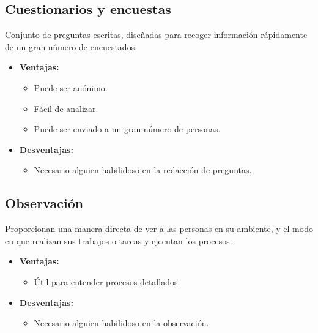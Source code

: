 \documentclass{templateApunte}
\begin{document}
\subsection{Cuestionarios y encuestas}\hypertarget{cuestionarios_y_encuestas}{}
Conjunto de preguntas escritas, diseñadas para recoger información rápidamente de un gran número de encuestados.
\begin{itemize}
  \item \textbf{Ventajas:}
  \begin{itemize}
    \item Puede ser anónimo.
    \item Fácil de analizar.
    \item Puede ser enviado a un gran número de personas.
  \end{itemize}
  \item \textbf{Desventajas:}
  \begin{itemize}
    \item Necesario alguien habilidoso en la redacción de preguntas.
  \end{itemize}
\end{itemize}

\subsection{Observación}\hypertarget{observacion}{}
Proporcionan una manera directa de ver a las personas en su ambiente, y el modo en que realizan sus trabajos o tareas y ejecutan los procesos.
\begin{itemize}
  \item \textbf{Ventajas:}
  \begin{itemize}
    \item Útil para entender procesos detallados.
  \end{itemize}
  \item \textbf{Desventajas:}
  \begin{itemize}
    \item Necesario alguien habilidoso en la observación.
  \end{itemize}
\end{itemize}
\end{document}
